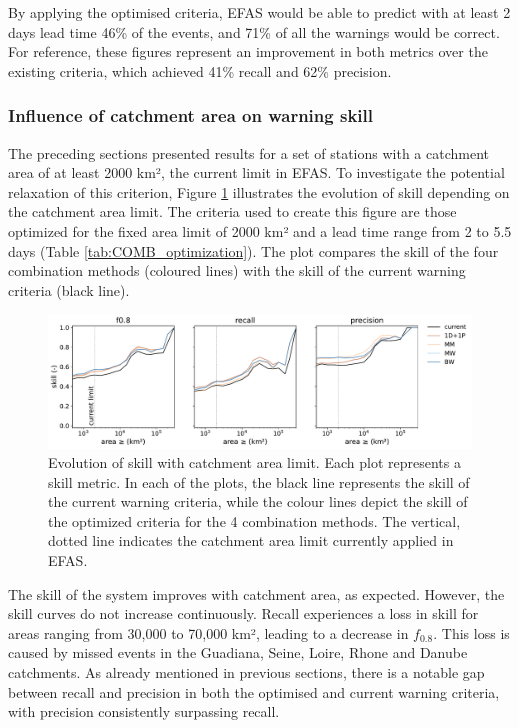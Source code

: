 \documentclass{ametsocV6.1}
\begin{document}
By applying the optimised criteria, EFAS would be able to predict with at least 2 days lead time 46\% of the events, and 71\% of all the warnings would be correct. For reference, these figures represent an improvement in both metrics over the existing criteria, which achieved 41\% recall and 62\% precision.

\subsubsection{Influence of catchment area on warning skill}
\label{sec:skill_area}

The preceding sections presented results for a set of stations with a catchment area of at least 2000 km², the current limit in EFAS. To investigate the potential relaxation of this criterion, Figure \ref{fig:skill_area} illustrates the evolution of skill depending on the catchment area limit. The criteria used to create this figure are those optimized for the fixed area limit of 2000 km² and a lead time range from 2 to 5.5 days (Table \ref{tab:COMB_optimization}). The plot compares the skill of the four combination methods (coloured lines) with the skill of the current warning criteria (black line).

\begin{figure}
    \centering
    \includegraphics[width=0.8\linewidth]{figure08.pdf}
    \caption{Evolution of skill with catchment area limit. Each plot represents a skill metric. In each of the plots, the black line represents the skill of the current warning criteria, while the colour lines depict the skill of the optimized criteria for the 4 combination methods. The vertical, dotted line indicates the catchment area limit currently applied in EFAS.}
    \label{fig:skill_area}
\end{figure}

The skill of the system improves with catchment area, as expected. However, the skill curves do not increase continuously. Recall experiences a loss in skill for areas ranging from 30,000 to 70,000 km², leading to a decrease in $f_{0.8}$. This loss is caused by missed events in the Guadiana, Seine, Loire, Rhone and Danube catchments. As already mentioned in previous sections, there is a notable gap between recall and precision in both the optimised and current warning criteria, with precision consistently surpassing recall. 
\end{document}
